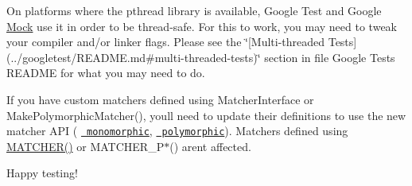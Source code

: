 On platforms where the pthread library is available, Google Test and Google \mbox{\hyperlink{class_mock}{Mock}} use it in order to be thread-\/safe. For this to work, you may need to tweak your compiler and/or linker flags. Please see the \char`\"{}\mbox{[}\+Multi-\/threaded Tests\mbox{]}(../googletest/\+R\+E\+A\+D\+M\+E.\+md\#multi-\/threaded-\/tests)\char`\"{} section in file Google Test\textquotesingle{}s R\+E\+A\+D\+ME for what you may need to do.

If you have custom matchers defined using {\ttfamily Matcher\+Interface} or {\ttfamily Make\+Polymorphic\+Matcher()}, you\textquotesingle{}ll need to update their definitions to use the new matcher A\+PI ( \href{./docs/CookBook.md\#writing-new-monomorphic-matchers}{\texttt{ monomorphic}}, \href{./docs/CookBook.md\#writing-new-polymorphic-matchers}{\texttt{ polymorphic}}). Matchers defined using {\ttfamily \mbox{\hyperlink{googletest-master_2googlemock_2include_2gmock_2gmock-generated-matchers_8h_af4fe73ff8e2b0494f4970b575b65ddff}{M\+A\+T\+C\+H\+E\+R()}}} or {\ttfamily M\+A\+T\+C\+H\+E\+R\+\_\+\+P$\ast$()} aren\textquotesingle{}t affected.

Happy testing! 